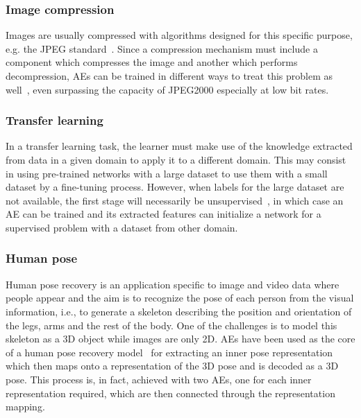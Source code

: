 \subsubsection{Image compression} Images are usually compressed with algorithms designed for this specific purpose, e.g. the JPEG standard~. Since a compression mechanism must include a component which compresses the image and another which performs decompression, AEs can be trained in different ways to treat this problem as well~, even surpassing the capacity of JPEG2000 especially at low bit rates.

\subsubsection{Transfer learning} In a transfer learning task, the learner must make use of the knowledge extracted from data in a given domain to apply it to a different domain. This may consist in using pre-trained networks with a large dataset to use them with a small dataset by a fine-tuning process. However, when labels for the large dataset are not available, the first stage will necessarily be unsupervised~, in which case an AE can be trained and its extracted features can initialize a network for a supervised problem with a dataset from other domain.

\subsubsection{Human pose } Human pose recovery is an application specific to image and video data where people appear and the aim is to recognize the pose of each person from the visual information, i.e., to generate a skeleton describing the position and orientation of the legs, arms and the rest of the body. One of the challenges is to model this skeleton as a 3D object while images are only 2D. AEs have been used as the core of a human pose recovery model~ for extracting an inner pose representation which then maps onto a representation of the 3D pose and is decoded as a 3D pose. This process is, in fact, achieved with two AEs, one for each inner representation required, which are then connected through the representation mapping. 

